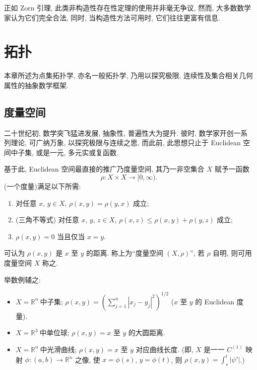 \documentclass[twoside, fontset=fandol, punct=kaiming]{ctexbook}
\theoremstyle{innocent}
\begin{document}
正如 Zorn 引理, 此类非构造性存在性定理的使用并非毫无争议, 然而, 大多数数学家认为它们完全合法, 同时, 当构造性方法可用时, 它们往往更富有信息.

\chapter{拓扑}
本章所述为点集拓扑学, 亦名一般拓扑学, 乃用以探究极限, 连续性及集合相关几何属性的抽象数学框架.

\section{度量空间}
二十世纪初, 数学突飞猛进发展, 抽象性, 普遍性大为提升. 彼时, 数学家开创一系列理论, 可广纳万象, 以探究极限与连续之思, 而此前, 此思想只止于 Euclidean 空间中子集, 或是一元, 多元实或复函数.

基于此, Euclidean 空间最直接的推广乃度量空间, 其乃一非空集合 $X$ 赋予一函数
\[\rho :X\times X\to [0,\infty).\]
(一个度量)满足以下所需:
\begin{enumerate}
    \item 对任意 $x$, $y\in X$, $\rho (x,y)=\rho (y,x)$ 成立;
    \item (三角不等式) 对任意 $x$, $y$, $z\in X$, $\rho (x,z)\leqslant \rho (x,y)+\rho (y,z)$ 成立;
    \item $\rho (x,y)=0$ 当且仅当 $x=y$.
\end{enumerate}
可认为 $\rho (x,y)$ 是 $x$ 至 $y$ 的距离. 称上为``度量空间 $(X,\rho)$'', 若 $\rho $ 自明, 则可用度量空间 $X$ 称之.

举数例辅之:
\begin{itemize}
    \item $X=\mathbb R^n~\textit{中子集}$; $\rho (x,y) = (\sum_{j=1}^n|x_j-y_j|^2)^{1 /2}$ ($x$ 至 $y$ 的 Euclidean 度量).
    \item $X=\mathbb R^3~\textit{中单位球}$; $\rho (x,y) = \text{$x$ 至 $y$ 的大圆距离}$.
    \item $X=\mathbb R^n~\textit{中光滑曲线}$; $\rho (x,y) = \text{$x$ 至 $y$ 对应曲线长度}$. (即, $X$ 是一一 $C^{(1)}$ 映射 $\phi :(a,b)\to \mathbb R^n$ 之像, 使 $x=\phi (s)$, $y=\phi (t)$, 则 $\rho (x,y)=\int_s^t|\psi '|$.)
\end{itemize}
\end{document}
